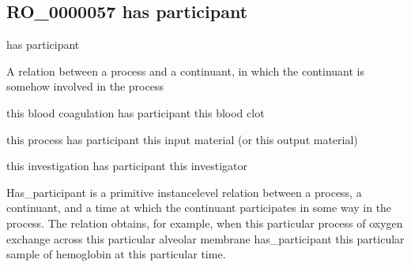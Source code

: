 \documentclass[letterpaper,10pt,english]{sphinxmanual}
\begin{document}
\begin{sphinxShadowBox}

\sphinxAtStartPar
{}
\end{sphinxShadowBox}
\begin{quote}

\ignorespaces \end{quote}


\subsection{RO\_0000057 \sphinxhyphen{} has participant}
\label{\detokenize{doc-RO_0000057:ro-0000057-has-participant}}\label{\detokenize{doc-RO_0000057:index-0}}\label{\detokenize{doc-RO_0000057::doc}}
\begin{sphinxShadowBox}

\sphinxAtStartPar
has participant
\end{sphinxShadowBox}

\begin{sphinxShadowBox}

\sphinxAtStartPar
A relation between a process and a continuant, in which the continuant is somehow involved in the process
\end{sphinxShadowBox}

\begin{sphinxShadowBox}

\sphinxAtStartPar
this blood coagulation has participant this blood clot

\sphinxAtStartPar
this process has participant this input material (or this output material)

\sphinxAtStartPar
this investigation has participant this investigator
\end{sphinxShadowBox}

\begin{sphinxShadowBox}

\sphinxAtStartPar
Has\_participant is a primitive instance\sphinxhyphen{}level relation between a process, a continuant, and a time at which the continuant participates in some way in the process. The relation obtains, for example, when this particular process of oxygen exchange across this particular alveolar membrane has\_participant this particular sample of hemoglobin at this particular time.
\end{sphinxShadowBox}
\end{document}
